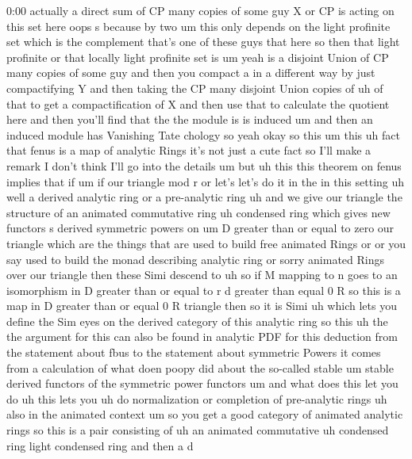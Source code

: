 \begin{unfinished}{0:00}
actually  a  direct  sum  of  CP  many  copies
of  some  guy  X  or  CP  is  acting  on  this
set  here  oops
s  because  by  two  um  this  only  depends  on
the  light  profinite  set  which  is  the
complement  that's  one  of  these  guys  that
here  so  then  that  light  profinite  or
that  locally  light  profinite  set  is  um
yeah  is  a  disjoint  Union  of  CP  many
copies  of  some  guy  and  then  you  compact
a  in  a  different  way  by  just
compactifying  Y  and  then  taking  the  CP
many  disjoint  Union  copies  of  uh  of  that
to  get  a  compactification  of  X  and  then
use  that  to  calculate  the  quotient  here
and  then  you'll  find  that  the  the  module
is  is
induced  um  and  then  an  induced  module
has  Vanishing  Tate  chology
so
yeah
okay
so  this
um  this  uh  fact  that  fenus  is  a  map  of
analytic  Rings  it's  not  just  a  cute  fact
so  I'll  make  a  remark  I  don't  think  I'll
go  into  the  details
um
but  uh  this  this
theorem  on
fenus  implies  that
if
um  if  our  triangle  mod  r  or  let's  let's
do  it  in
the  in  this  setting
uh
well  a  derived  analytic
ring  or  a  pre-analytic
ring  uh
and  we
give  our  triangle  the  structure
of  an  animated  commutative
ring  uh  condensed
ring  which  gives  new  functors  s  derived
symmetric  powers  on  um  D  greater  than  or
equal  to  zero  our
triangle  which  are  the  things  that  are
used  to  build  free  animated
Rings  or
or  you  say  used  to  build  the  monad
describing  analytic  ring  or  sorry
animated
Rings  over  our
triangle  then  these  Simi  descend
to  uh  so  if  M  mapping  to  n  goes  to  an
isomorphism  in  D  greater  than  or  equal
to  r  d  greater  than  equal  0  R  so  this  is
a  map  in  D  greater  than  or  equal  0  R
triangle  then  so  it  is
Simi  uh  which  lets  you  define  the  Sim
eyes  on  the  derived  category  of  this
analytic
ring
so  this  uh  the  the  argument  for  this  can
also  be  found  in  analytic
PDF  for  this  deduction  from  the
statement  about  fbus  to  the  statement
about  symmetric  Powers  it  comes  from  a
calculation  of  what  doen  poopy  did  about
the  so-called  stable  um  stable  derived
functors  of  the  symmetric  power
functors
um  and  what  does  this  let  you  do  uh
this  lets  you  uh  do
normalization  or
completion  of  pre-analytic
rings  uh
also  in  the  animated
context  um  so  you  get  a  good
category
of  animated  analytic
rings  so  this  is  a  pair  consisting  of  uh
an
animated  commutative  uh  condensed  ring
light  condensed  ring  and  then  a  d

\end{unfinished}
